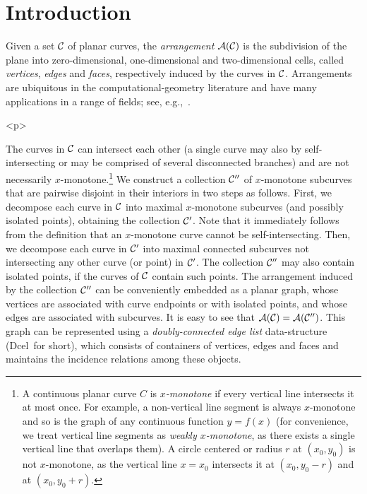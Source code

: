 \newcommand{\reals}{{\rm I\!\hspace{-0.025em} R}}
\newcommand{\calC}{{\cal C}}
\newcommand{\calA}{{\cal A}}
\newcommand{\eps}{{\varepsilon}}
\newcommand{\dcel}{{\sc Dcel}}
\newcommand{\naive}{na\"{\i}ve}
\newcommand{\kdtree}{{\sc Kd}-tree}
\newcommand{\boost}{{\sc Boost}}

\newcommand{\htmlP}{\begin{ccHtmlOnly}<p>\end{ccHtmlOnly}}

\section{Introduction}
\label{arr_sec:intro}
%
Given a set $\calC$ of planar curves, the {\em arrangement}
$\calA(\calC)$ is the subdivision of the plane into zero-dimensional,
one-dimensional and two-dimensional cells, called {\em vertices}, {\em
edges} and {\em faces}, respectively induced by the curves in $\calC$.
Arrangements are ubiquitous in the computational-geometry
literature and have many applications in a range of fields;
see, e.g.,~\cite{as-aa-00,cgal:h-a-04}.

\begin{ccHtmlOnly}<p>\end{ccHtmlOnly}
The curves in $\calC$ can intersect each other (a single curve may also
by self-intersecting or may be comprised of several disconnected branches)
and are not necessarily $x$-monotone.\footnote{A continuous planar curve $C$
is {\em $x$-monotone} if every vertical line intersects it at
most once. For example, a non-vertical line segment is always
$x$-monotone and so is the graph of any continuous function $y = f(x)$
(for convenience, we treat vertical line segments as {\em weakly
$x$-monotone}, as there exists a single vertical line that overlaps them).
A circle centered or radius $r$ at $(x_0, y_0)$ is not $x$-monotone, as
the vertical line $x = x_0$ intersects it at $(x_0, y_0 - r)$ and at
$(x_0, y_0 + r)$.}
We construct a collection $\calC''$ of
$x$-monotone subcurves that are pairwise disjoint in their interiors
in two steps as follows. First, we decompose each curve in $\calC$
into maximal $x$-monotone subcurves (and possibly isolated points),
obtaining the collection $\calC'$. Note that it immediately follows
from the definition that an $x$-monotone curve cannot be
self-intersecting. Then, we decompose each curve in $\calC'$ into
maximal connected subcurves not intersecting any other
curve (or point) in $\calC'$. The collection $\calC''$ may also
contain isolated points, if the curves of $\calC$ contain such
points. The arrangement induced by the collection $\calC''$ can be
conveniently embedded as a planar graph, whose vertices are associated
with curve endpoints or with isolated points, and whose edges are
associated with subcurves. It is easy to see that
$\calA(\calC) = \calA(\calC'')$. This graph can be represented using a
{\em doubly-connected edge list} data-structure (\dcel\ for short),
which consists of containers of vertices, edges and faces and
maintains the incidence relations among these objects.

